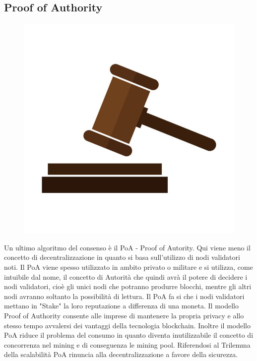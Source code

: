 \documentclass[12pt,titlepage]{report}
\begin{document}
\subsection{Proof of Authority}
\begin{figure}
	\includegraphics[height=0.3\textheight]{judge}
\end{figure}
Un ultimo algoritmo del consenso è il PoA - Proof of Autority. Qui viene meno il concetto di decentralizzazione in quanto si basa sull'utilizzo di nodi validatori noti. Il PoA viene spesso utilizzato in ambito privato o militare e si utilizza, come intuibile dal nome, il concetto di Autorità che quindi avrà il potere di decidere i nodi validatori, cioè gli unici nodi che potranno produrre blocchi, mentre gli altri nodi avranno soltanto la possibilità di lettura. Il PoA fa si che i nodi validatori mettano in "Stake" la loro reputazione a differenza di una moneta. Il modello Proof of Authority consente alle imprese di mantenere la propria privacy e allo stesso tempo avvalersi dei vantaggi della tecnologia blockchain. Inoltre il modello PoA riduce il problema del consumo in quanto diventa inutilizzabile il concetto di concorrenza nel mining e di conseguenza le mining pool. Riferendosi al Trilemma della scalabilità PoA rinuncia alla decentralizzazione a favore della sicurezza.
\end{document}
